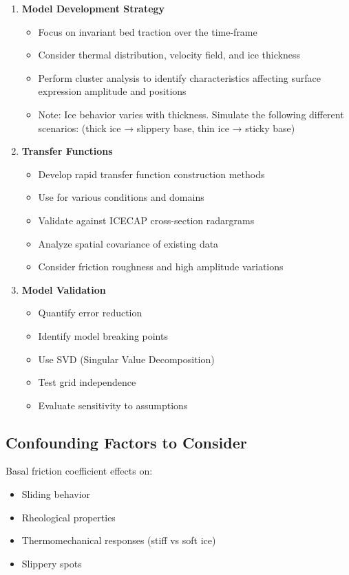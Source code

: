 \begin{enumerate}
\item\textbf{Model Development Strategy}
    \begin{itemize}
    \item Focus on invariant bed traction over the time-frame
    \item Consider thermal distribution, velocity field, and ice thickness
    \item Perform cluster analysis to identify characteristics affecting surface expression amplitude and positions
    \item Note: Ice behavior varies with thickness. Simulate the following different scenarios: (thick ice → slippery base, thin ice → sticky base)
    \end{itemize}
\item\textbf{Transfer Functions}
    \begin{itemize}
    \item Develop rapid transfer function construction methods
    \item Use for various conditions and domains
    \item Validate against ICECAP cross-section radargrams
    \item Analyze spatial covariance of existing data
    \item Consider friction roughness and high amplitude variations
    \end{itemize}
\item\textbf{Model Validation}
    \begin{itemize}
    \item Quantify error reduction
    \item Identify model breaking points
    \item Use SVD (Singular Value Decomposition)
    \item Test grid independence
    \item Evaluate sensitivity to assumptions
    \end{itemize}
\end{enumerate}


\subsection*{Confounding Factors to Consider}

Basal friction coefficient effects on:
\begin{itemize}
    \item Sliding behavior
    \item Rheological properties
    \item Thermomechanical responses (stiff vs soft ice)
    \item Slippery spots
    \end{itemize}


